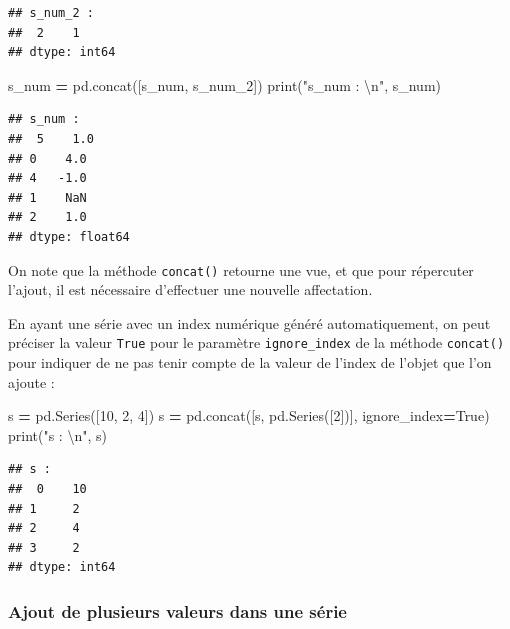 \documentclass[
  12pt,
]{book}
\newenvironment{Shaded}{\begin{snugshade}}{\end{snugshade}}
\newcommand{\BuiltInTok}[1]{#1}
\newcommand{\CharTok}[1]{\textcolor[rgb]{0.31,0.60,0.02}{#1}}
\newcommand{\DecValTok}[1]{\textcolor[rgb]{0.00,0.00,0.81}{#1}}
\newcommand{\NormalTok}[1]{#1}
\newcommand{\OperatorTok}[1]{\textcolor[rgb]{0.81,0.36,0.00}{\textbf{#1}}}
\newcommand{\StringTok}[1]{\textcolor[rgb]{0.31,0.60,0.02}{#1}}
\newcommand{\VariableTok}[1]{\textcolor[rgb]{0.00,0.00,0.00}{#1}}
\numberwithin{equation}{section}
\numberwithin{countremarque}{section}
\begin{document}
\begin{lstlisting}
## s_num_2 : 
##  2    1
## dtype: int64
\end{lstlisting}

\begin{Shaded}
\begin{Highlighting}[]
\NormalTok{s\_num }\OperatorTok{=}\NormalTok{ pd.concat([s\_num, s\_num\_2])}
\BuiltInTok{print}\NormalTok{(}\StringTok{"s\_num : }\CharTok{\textbackslash{}n}\StringTok{"}\NormalTok{, s\_num)}
\end{Highlighting}
\end{Shaded}

\begin{lstlisting}
## s_num : 
##  5    1.0
## 0    4.0
## 4   -1.0
## 1    NaN
## 2    1.0
## dtype: float64
\end{lstlisting}

On note que la méthode \texttt{concat()} retourne une vue, et que pour répercuter l'ajout, il est nécessaire d'effectuer une nouvelle affectation.

En ayant une série avec un index numérique généré automatiquement, on peut préciser la valeur \texttt{True} pour le paramètre \texttt{ignore\_index} de la méthode \texttt{concat()} pour indiquer de ne pas tenir compte de la valeur de l'index de l'objet que l'on ajoute :

\begin{Shaded}
\begin{Highlighting}[]
\NormalTok{s }\OperatorTok{=}\NormalTok{ pd.Series([}\DecValTok{10}\NormalTok{, }\DecValTok{2}\NormalTok{, }\DecValTok{4}\NormalTok{])}
\NormalTok{s }\OperatorTok{=}\NormalTok{ pd.concat([s, pd.Series([}\DecValTok{2}\NormalTok{])], ignore\_index}\OperatorTok{=}\VariableTok{True}\NormalTok{)}
\BuiltInTok{print}\NormalTok{(}\StringTok{"s : }\CharTok{\textbackslash{}n}\StringTok{"}\NormalTok{, s)}
\end{Highlighting}
\end{Shaded}

\begin{lstlisting}
## s : 
##  0    10
## 1     2
## 2     4
## 3     2
## dtype: int64
\end{lstlisting}

\subsubsection{Ajout de plusieurs valeurs dans une série}\label{ajout-de-plusieurs-valeurs-dans-une-suxe9rie}
\end{document}
